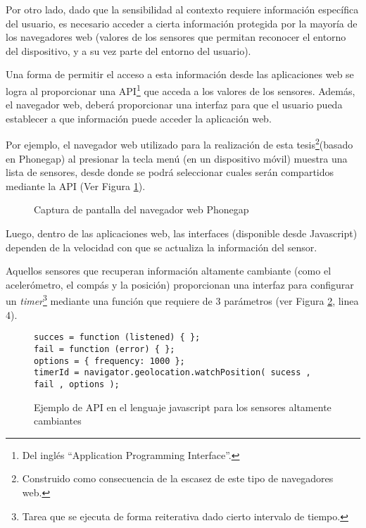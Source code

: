 Por otro lado, dado que la sensibilidad al contexto requiere información específica del usuario, es necesario acceder a cierta información protegida por la mayoría de los navegadores web (valores de los sensores que permitan reconocer el entorno del dispositivo, y a su vez parte del entorno del usuario).

Una forma de permitir el acceso a esta información desde las aplicaciones web se logra al proporcionar una API\footnote{Del inglés ``Application Programming Interface''.} que acceda a los valores de los sensores. Además, el navegador web, deberá proporcionar una interfaz para que el usuario pueda establecer a que información puede acceder la aplicación web.

Por ejemplo, el navegador web utilizado para la realización de esta tesis\footnote{Construido como consecuencia de la escasez de este tipo de navegadores web.}(basado en Phonegap) al presionar la tecla menú (en un dispositivo móvil) muestra una lista de sensores, desde donde se podrá seleccionar cuales serán compartidos mediante la API (Ver Figura \ref{PhoneGapBrowserLike}).

\begin{figure}[ht!]
\centering
{}
\caption{Captura de pantalla del navegador web Phonegap}
\label{PhoneGapBrowserLike}
\end{figure}

Luego, dentro de las aplicaciones web, las interfaces (disponible desde Javascript) dependen de la velocidad con que se actualiza la información del sensor.

Aquellos sensores que recuperan información altamente cambiante (como el acelerómetro, el compás y la posición) proporcionan una interfaz para configurar un \emph{timer}\footnote{Tarea que se ejecuta de forma reiterativa dado cierto intervalo de tiempo.} mediante una función que requiere de 3 parámetros (ver Figura \ref{PhonegapAPI}, linea 4).

\begin{figure}[ht!]
\begin{Verbatim}
succes = function (listened) { };
fail = function (error) { };
options = { frequency: 1000 };
timerId = navigator.geolocation.watchPosition( sucess , fail , options );
\end{Verbatim}
\caption{Ejemplo de API en el lenguaje javascript para los sensores altamente cambiantes}
\label{PhonegapAPI}
\end{figure}

